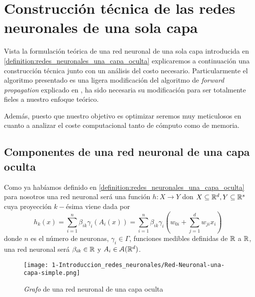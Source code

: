 %

\chapter{Construcción técnica de las redes neuronales de una sola capa}  
\label{chapter:construir-redes-neuronales}
Vista la formulación teórica de una red neuronal de una sola capa 
introducida en \ref{definition:redes_neuronales_una_capa_oculta} explicaremos a continuación  una construcción técnica junto con un
análisis del costo necesario.
 Particularmente el algoritmo presentado es una ligera modificación del algoritmo de    
\textit{forward propagation} explicado en \cite{BishopPaterRecognition}, ha sido necesaria su modificación para ser totalmente fieles a nuestro enfoque teórico. 

Además, puesto que nuestro objetivo es optimizar seremos muy meticulosos en cuanto a analizar el coste computacional tanto de cómputo como de memoria.

\section{Componentes de una red neuronal de una capa oculta} 

Como ya habíamos definido en \ref{definition:redes_neuronales_una_capa_oculta}  
para nosotros una red neuronal será  una función $h : X \longrightarrow Y$ don $X \subseteq \mathbb{R}^d, Y \subseteq \mathbb{R}^s$ 
cuya proyección $k-$ésima viene dada por
\begin{equation}
    h_k(x) =  \sum_{i=1}^{n} \beta_{i k} \gamma_{i}( A_{i}(x))
    = 
    \sum_{i=1}^{n} \beta_{i k} \gamma_{i}
    \left(
        w_{0 i} + \sum_{j=1}^d w_{j i } x_i
    \right) 
\end{equation}
donde $n$ es el número de neuronas,   $\gamma_{i} \in \Gamma$, funciones medibles definidas de $\mathbb{R}$ a $\mathbb{R}$, una red neuronal será 
$\beta_{i k} \in \mathbb{R}$ y $A_i \in \mathcal{A}(\mathbb{R}^d)$.

\begin{figure}[h!]
    \centering
    \texttt{[image: 1-Introduccion\_redes\_neuronales/Red-Neuronal-una-capa-simple.png]}
    \caption{\textit{Grafo} de una red neuronal de una capa oculta}
    \label{img:grafo-red-neuronal-una-capa-oculta_repeticion}
\end{figure}

